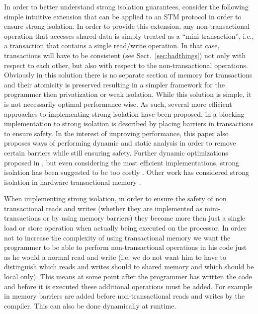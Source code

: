 In order to better understand strong isolation guarantees, consider
the following simple intuitive extension that can be applied to an STM protocol
in order to ensure strong isolation.
In order to provide this extension, any non-transactional operation that 
accesses shared data is simply treated as a ``mini-transaction'', i.e., a transaction  that contains a
single read/write operation. In that case,  transactions  will have to  be  
consistent (see Sect.~\ref{sec:badthings})  not only with 
respect to each other, but 
also with respect to the  non-transactional operations.
Obviously in this solution there is no separate section of memory for transactions
and their atomicity is preserved resulting in a simpler framework for
the programmer then privatization or weak isolation.
While this solution is simple, it is not necessarily optimal performance wise.
As such, several more efficient approaches to implementing strong isolation have been proposed,
in \cite{shpeis07} a blocking implementation to strong isolation
is described by placing barriers in transactions to ensure safety.
In the interest of improving performance, this paper also proposes ways of performing dynamic
and static analysis in order to remove certain barriers
while still ensuring safety.
Further dynamic optimizations proposed in \cite{SMSA08}, but
even considering the most efficient implementations, strong isolation has been suggested to be too costly \cite{DS09}.
Other work has considered strong isolation in hardware transactional memory \cite{MTCM07}.

When implementing strong isolation, in order to ensure the safety of non transactional reads and writes
(whether they are implemented as mini-transactions or by using memory barriers)
they become more then just a single load or store operation when actually being executed on the processor.
In order not to increase the complexity of using transactional memory we want the programmer to be
able to perform non-transactional operations in his code just as he would a normal read and write
(i.e. we do not want him to have to distinguish which reads and writes should to shared memory and which
should be local only).
This means at some point after the programmer has written the code and before it is executed
these additional operations must be added.
For example in \cite{shpeis07,SMSA08} memory barriers are added before non-transactional reads and writes
by the compiler.
This can also be done dynamically at runtime.



